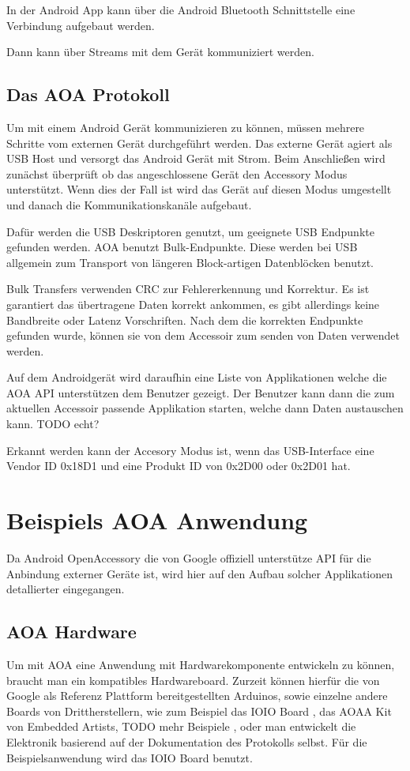 \documentclass[12pt,journal,compsoc]{IEEEtran}
\begin{document}

In der Android App kann über die Android Bluetooth Schnittstelle eine Verbindung aufgebaut werden.

Dann kann über Streams mit dem Gerät kommuniziert werden.

\subsection{Das AOA Protokoll}
Um mit einem Android Gerät kommunizieren zu können, müssen mehrere Schritte vom externen Gerät durchgeführt werden.
Das externe Gerät agiert als USB Host und versorgt das Android Gerät mit Strom.
Beim Anschließen wird zunächst überprüft ob das angeschlossene Gerät den Accessory Modus unterstützt.
Wenn dies der Fall ist wird das Gerät auf diesen Modus umgestellt und danach die Kommunikationskanäle aufgebaut.

Dafür werden die USB Deskriptoren genutzt, um geeignete USB Endpunkte gefunden werden. AOA benutzt Bulk-Endpunkte. Diese werden bei USB allgemein zum Transport von längeren Block-artigen Datenblöcken benutzt.

Bulk Transfers verwenden CRC zur Fehlererkennung und Korrektur. Es ist garantiert das übertragene Daten korrekt ankommen, es gibt allerdings keine Bandbreite oder Latenz Vorschriften.
\cite{usbbulk}
Nach dem die korrekten Endpunkte gefunden wurde, können sie von dem Accessoir zum senden von Daten verwendet werden.

Auf dem Androidgerät wird daraufhin eine Liste von Applikationen welche die AOA API unterstützen dem Benutzer gezeigt. Der Benutzer kann dann die zum aktuellen Accessoir passende Applikation starten, welche dann Daten austauschen kann. TODO echt?


Erkannt werden kann der Accesory Modus ist, wenn das USB-Interface eine Vendor ID 0x18D1 und eine Produkt ID von 0x2D00 oder 0x2D01 hat. 

\section{Beispiels AOA Anwendung}
Da Android OpenAccessory die von Google offiziell unterstütze API für die Anbindung externer Geräte ist, wird hier auf den Aufbau solcher Applikationen detallierter eingegangen.
\subsection{AOA Hardware}
Um mit AOA eine Anwendung mit Hardwarekomponente entwickeln zu können, braucht man ein kompatibles Hardwareboard.
Zurzeit können hierfür die von Google als Referenz Plattform bereitgestellten Arduinos, sowie einzelne andere Boards von Drittherstellern, wie zum Beispiel das IOIO Board \cite{ioio}, das AOAA Kit von Embedded Artists\cite{aoaa},  TODO mehr Beispiele , oder man entwickelt die Elektronik basierend auf der Dokumentation des Protokolls selbst\cite{aoaprotocol2}.
Für die Beispielsanwendung wird das IOIO Board benutzt.
\end{document}

